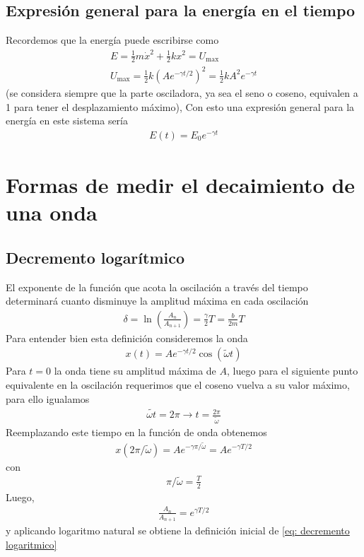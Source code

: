 \documentclass[12pt]{article}
\begin{document}
\subsection{Expresión general para la energía en el tiempo}
Recordemos que la energía puede escribirse como
\begin{align*}
    E = \frac{1}{2} m \dot{x}^{2} + \frac{1}{2} k x ^{2} = U_\text{max} \\
    U_\text{max} = \frac{1}{2} k(A e^{-\gamma t /2})^{2} = \frac{1}{2}k A^{2} e^{-\gamma t}
\end{align*}
(se considera siempre que la parte osciladora, ya sea el seno o coseno, equivalen a 1 para tener el desplazamiento máximo), Con esto una expresión general para la energía en este sistema sería
\begin{align}
    E(t)  = E_0 e^{-\gamma t } \label{eq: E(t) en movimiento amortiguado}
\end{align}
\section{Formas de medir el decaimiento de una onda}
\subsection{Decremento logarítmico}
El exponente de la función que acota la oscilación a través del tiempo determinará cuanto disminuye la amplitud máxima en cada oscilación
\begin{align}
    \delta = \ln\left(\frac{A_n}{A_{n+1}}\right) = \frac{\gamma}{2}T = \frac{b}{2m}  T \label{eq: decremento logaritmico}
\end{align}
Para entender bien esta definición consideremos la onda 
\begin{align*}
    x(t) = A e^{-\gamma t/2} \cos(\tilde{\omega }t)
\end{align*}
Para \(t= 0 \) la onda tiene su amplitud máxima de \(A\), luego para el siguiente punto equivalente en la oscilación requerimos que el coseno vuelva a su valor máximo, para ello igualamos
\begin{align*}
    \tilde{\omega t} = 2\pi \rightarrow t = \frac{2\pi}{\tilde{\omega}}
\end{align*}
Reemplazando este tiempo en la función de onda obtenemos
\begin{align*}
    x(2\pi/\tilde{\omega}) = A e^{-\gamma \pi/\tilde{\omega}} =  A e^{-\gamma T/2}
\end{align*}
con 
\begin{align*}
    \pi/\tilde{\omega} = \frac{T}{2}
\end{align*}
Luego,
\begin{align*}
    \frac{A_n}{A_{n+1}} = e^{\gamma T / 2}
\end{align*}
y aplicando logaritmo natural se obtiene la definición inicial de \eqref{eq: decremento logaritmico}
\end{document}
